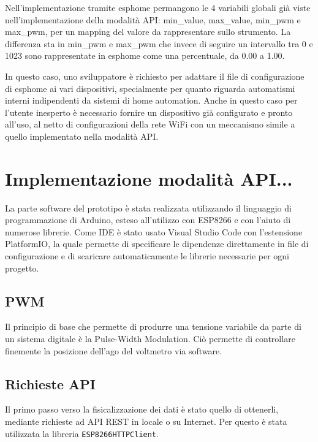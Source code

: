 \documentclass[12pt,a4paper]{report}
\begin{document}
Nell'implementazione tramite esphome permangono le 4 variabili globali già viste nell'implementazione della modalità API:
min_value, max_value, min_pwm e max_pwm, per un mapping del valore da rappresentare sullo strumento.
La differenza sta in min_pwm e max_pwm che invece di seguire un intervallo tra 0 e 1023 sono rappresentate in esphome come una percentuale,
da 0.00 a 1.00.

In questo caso, uno sviluppatore è richiesto per adattare il file di configurazione di esphome ai vari dispositivi, specialmente per quanto riguarda
automatismi interni indipendenti da sistemi di home automation. Anche in questo caso per l'utente inesperto è necessario fornire un dispositivo già
configurato e pronto all'uso, al netto di configurazioni della rete WiFi con un meccanismo simile a quello implementato nella modalità API.







\section{Implementazione modalità API...}
La parte software del prototipo è stata realizzata utilizzando il linguaggio di programmazione di Arduino, esteso all'utilizzo con
ESP8266 e con l'aiuto di numerose librerie. Come IDE è stato usato Visual Studio Code con l'estensione PlatformIO, la quale
permette di specificare le dipendenze direttamente in file di configurazione e di scaricare automaticamente le librerie necessarie
per ogni progetto.

\subsection{PWM}
Il principio di base che permette di produrre una tensione variabile da parte di un sistema digitale è la Pulse-Width Modulation.
Ciò permette di controllare finemente la posizione dell'ago del voltmetro via software.

\subsection{Richieste API}
Il primo passo verso la fisicalizzazione dei dati è stato quello di ottenerli, mediante richieste ad API REST in locale o su Internet.
Per questo è stata utilizzata la libreria \texttt{ESP8266HTTPClient}.
\end{document}
